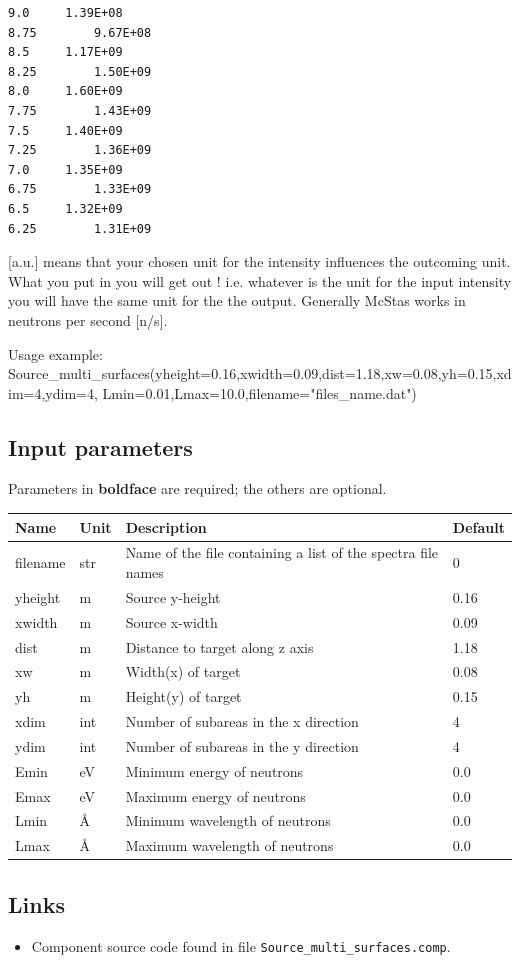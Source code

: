 \begin{verbatim}
9.0		1.39E+08
8.75		9.67E+08
8.5		1.17E+09
8.25		1.50E+09
8.0		1.60E+09
7.75		1.43E+09
7.5		1.40E+09
7.25		1.36E+09
7.0		1.35E+09
6.75		1.33E+09
6.5		1.32E+09
6.25		1.31E+09
\end{verbatim}

[a.u.] means that your chosen unit for the intensity influences the outcoming unit. What you put in you will get out ! i.e. whatever is the unit for the input intensity you will have the same unit for the the output. Generally McStas works in neutrons per second [n/s].

Usage example: Source\_multi\_surfaces(yheight=0.16,xwidth=0.09,dist=1.18,xw=0.08,yh=0.15,xdim=4,ydim=4, Lmin=0.01,Lmax=10.0,filename="files\_name.dat")

\subsection*{Input parameters}
Parameters in \textbf{boldface} are required; the others are optional.

\begin{longtable}{p{}p{}p{}p{}}
\toprule
\textbf{Name} & \textbf{Unit} & \textbf{Description} & \textbf{Default} \\
\midrule
\endhead
filename & str & Name of the file containing a list of the spectra file names & 0 \\
yheight & m & Source y-height & 0.16 \\
xwidth & m & Source x-width & 0.09 \\
dist & m & Distance to target along z axis & 1.18 \\
xw & m & Width(x) of target & 0.08 \\
yh & m & Height(y) of target & 0.15 \\
xdim & int & Number of subareas in the x direction & 4 \\
ydim & int & Number of subareas in the y direction & 4 \\
Emin & eV & Minimum energy of neutrons & 0.0 \\
Emax & eV & Maximum energy of neutrons & 0.0 \\
Lmin & \AA{} & Minimum wavelength of neutrons & 0.0 \\
Lmax & \AA{} & Maximum wavelength of neutrons & 0.0 \\
\bottomrule
\end{longtable}

\subsection*{Links}
\begin{itemize}
  \item Component source code found in file \texttt{Source\_multi\_surfaces.comp}.
\end{itemize}
